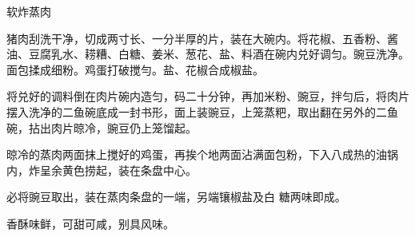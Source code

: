 \begin{recipe}{软炸蒸肉}

\ingredients






\cooking

\step 猪肉刮洗干净，切成两寸长、一分半厚的片，装在大碗内。将花椒、五香粉、酱油、豆腐乳水、耢糟、白糖、姜米、葱花、盐、料酒在碗内兑好调匀。豌豆洗净。面包揉成细粉。鸡蛋打破搅勻。盐、花椒合成椒盐。

\step 将兑好的调料倒在肉片碗内造匀，码二十分钟，再加米粉、豌豆，拌匀后，将肉片摆入洗净的二鱼碗底成一封书形，面上装豌豆，上笼蒸粑，取出翻在另外的二鱼碗，拈出肉片晾冷，豌豆仍上笼馏起。

\step 晾冷的蒸肉两面抹上搅好的鸡蛋，再挨个地两面沾满面包粉，下入八成热的油锅内，炸呈余黄色捞起，装在条盘中心。

必将豌豆取出，装在蒸肉条盘的一端，另端镶椒盐及白 糖两味即成。

\notes

香酥味鲜，可甜可咸，别具风味。

\end{recipe}

